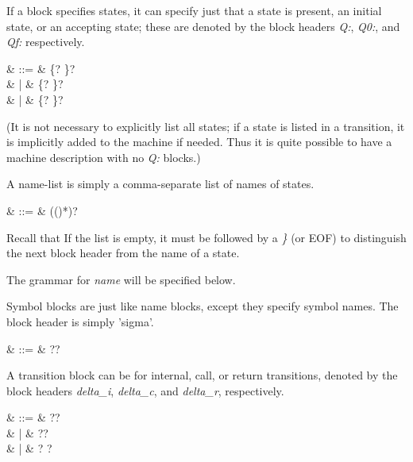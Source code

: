 If a block specifies states, it can specify just that a state is
present, an initial state, or an accepting state; these are denoted by
the block headers \textsl{Q:}, \textsl{Q0:}, and \textsl{Qf:}
respectively.
 
\begin{grammar}
   &  ::= &  \cfgsp \term\{? \cfgsp {}\cfgsp\term\}? \\
                        &   |  & \cfgsp \term\{? \cfgsp {}\cfgsp\term\}? \\
                        &   |  & \cfgsp \term\{? \cfgsp {}\cfgsp\term\}?
\end{grammar}

(It is not necessary to explicitly list all states; if a state is
listed in a transition, it is implicitly added to the machine if
needed. Thus it is quite possible to have a machine description with
no \textsl{Q:} blocks.)

A name-list is simply a comma-separate list of names of states.

\begin{grammar}
   & ::= & (\cfgsp (\term{,}\cfgsp  {})*)?
\end{grammar}

Recall that If the list is empty, it must be followed by a \textsl{\}}
(or EOF) to distinguish the next block header from the name of a
state.

The grammar for \textsl{name} will be specified below.


Symbol blocks are just like name blocks, except they specify symbol
names. The block header is simply 'sigma'.

\begin{grammar}
   & ::= & \cfgsp  \term{\{}?\cfgsp  {}\cfgsp  \term{\}}?
\end{grammar}

A transition block can be for internal, call, or return transitions,
denoted by the block headers \textsl{delta\_i}, \textsl{delta\_c}, and
\textsl{delta\_r}, respectively.
 
\begin{grammar}
   & ::= & \cfgsp  \term{\{}?\cfgsp  {}\cfgsp  \term{\}}? \\
                        &   | & \cfgsp  \term{\{}?\cfgsp  {}\cfgsp  \term{\}}? \\
                        &   | & \cfgsp  \term{\{}?\cfgsp  {}  \cfgsp  \term{\}}?
\end{grammar}

